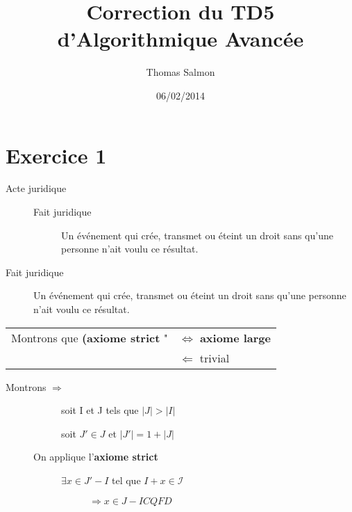 \documentclass[a4paper]{article}
\title{Correction du TD5 d'Algorithmique Avancée}
\author{Thomas Salmon}
\date{06/02/2014}
\begin{document}
\maketitle
\section{Exercice 1}
\begin{description}
    \item[Acte juridique] 
		\begin{description}
    		\item[]
		    \item[Fait juridique] Un événement qui crée, transmet ou éteint un droit sans qu'une personne n'ait voulu ce résultat.
		\end{description}
    \item[Fait juridique] Un événement qui crée, transmet ou éteint un droit sans qu'une personne n'ait voulu ce résultat.
\end{description}

\begin{tabular}{ll}
Montrons que \textbf{(axiome strict} " & $\Leftrightarrow$ \textbf{axiome large}\\
												              &  $\Leftarrow$ trivial\\
\end{tabular}


\begin{description}
    \item[Montrons $\Rightarrow$] 
		\begin{description}
    		\item[]
		    \item[] soit I et J tels que $|J| > |I|$
			\item[] soit $J' \in J$ et $|J'| = 1 + |J|$
		\end{description}
    \item[] On applique l'\textbf{axiome strict}
    \item[] 
    	\begin{description}
			\item[] $\exists x \in J' - I$  tel que $I + x \in \mathcal{I}$ 	
			\begin{description}
				\item[]
				\item[] $\Rightarrow x \in J - I CQFD$
			\end{description}
    	\end{description}
\end{description}
\end{document}
